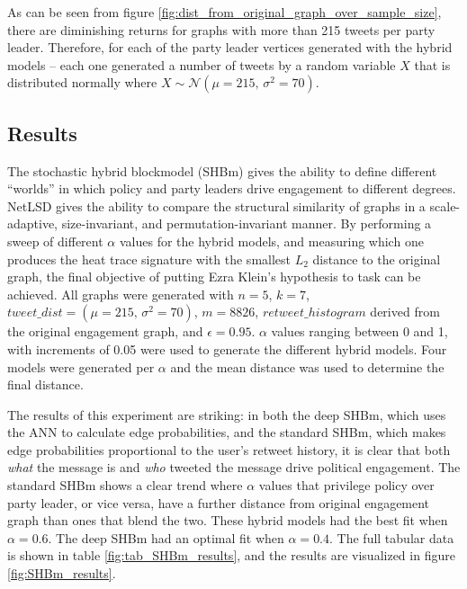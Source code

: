 As can be seen from figure \ref{fig:dist_from_original_graph_over_sample_size},
there are diminishing returns for graphs with more than 215 tweets per party
leader. Therefore, for each of the party leader vertices generated with the
hybrid models -- each one generated a number of tweets by a random variable $X$
that is distributed normally where $X \sim
\mathcal{N}(\mu=215,\,\sigma^{2}=70)$.

\subsection{Results}\label{sec:SBMsResults}

The stochastic hybrid blockmodel (SHBm) gives the ability to define different
``worlds'' in which policy and party leaders drive engagement to different
degrees. NetLSD gives the ability to compare the structural similarity of graphs
in a scale-adaptive, size-invariant, and permutation-invariant manner. By
performing a sweep of different $\alpha$ values for the hybrid models, and
measuring which one produces the heat trace signature with the smallest $L_2$
distance to the original graph, the final objective of putting Ezra Klein's
hypothesis to task can be achieved. All graphs were generated with $n=5$, 
$k=7$, $tweet\_dist=(\mu=215,\,\sigma^{2}=70)$, $m=8826$, $retweet\_histogram$
derived from the original engagement graph, and $\epsilon=0.95$. $\alpha$ values
ranging between 0 and 1, with increments of 0.05 were used to generate the
different hybrid models. Four models were generated per $\alpha$ and the mean
distance was used to determine the final distance.

The results of this experiment are striking: in both the deep SHBm, which uses
the ANN to calculate edge probabilities, and the standard SHBm, which makes
edge probabilities proportional to the user's retweet history, it is clear that
both \emph{what} the message is and \emph{who} tweeted the message drive
political engagement. The standard SHBm shows a clear trend where $\alpha$
values that privilege policy over party leader, or vice versa, have a further
distance from original engagement graph than ones that blend the two. These hybrid models
had the best fit when $\alpha=0.6$. The deep SHBm had an optimal fit when
$\alpha=0.4$. The full tabular data is shown in table
\ref{fig:tab_SHBm_results}, and the results are visualized in figure \ref{fig:SHBm_results}.

